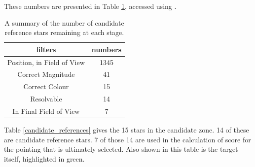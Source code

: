\documentclass{aa}
\begin{document}
These numbers are presented in Table \ref{summary_of_references}, accessed using \citet{rcurl}. 

\begin{table}[!htb]
\centering
\begin{tabular}{cc}
\hline\hline
filters & numbers\\
\hline
Position, in Field of View & 1345\\
Correct Magnitude & 41\\
Correct Colour & 15\\
Resolvable & 14\\
In Final Field of View & 7\\
\hline
\end{tabular}
\caption{\label{summary_of_references}A summary of the number of candidate reference stars remaining at each stage.}
\end{table}


Table \ref{candidate_references} gives the 15 stars in the candidate zone.  14 of these are candidate reference stars.  7 of those 14 are used in the calculation of score for the pointing that is ultimately selected.  Also shown in this table is the target itself, highlighted in green. 
\end{document}
